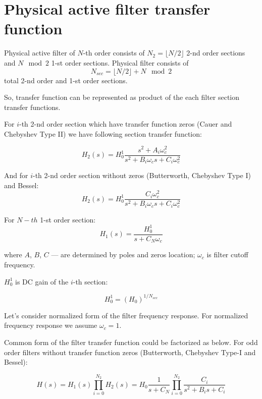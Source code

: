 \section{Physical active filter transfer function}

Physical active filter of $N$-th order consists of $N_{2} = \lfloor N/2\rfloor$
2-nd order sections and $N\mod 2$ 1-st order sections. Physical filter consists
of
\begin{equation}
 N_{sec}=\lfloor N/2\rfloor+N\mod 2 \label{order-sections}
\end{equation}
total 2-nd order and 1-st order sections.

So, transfer function can be represented as product of the each filter section
transfer functions.

For $i$-th 2-nd order section which have transfer function zeros (Cauer and
Chebyshev Type II) we have following section transfer function:

\begin{equation}
 H_2(s)=H_0^1\frac{s^2+A_i\omega_c^2}{s^2+B_i\omega_c s+C_i\omega_c^2}
\label{2ord1}
\end{equation}

And for $i$-th 2-nd order section without zeros (Butterworth, Chebyshev Type I)
and Bessel:
\begin{equation}
 H_2(s)=H_0^1\frac{C_i\omega_c^2}{s^2+B_i\omega_c s+C_i\omega_c^2} \label{2ord2}
\end{equation}

For $N-th$ 1-st order section:
\begin{equation}
 H_1(s)=\frac{H_0^1}{s+C_N\omega_c} \label{1ord}
\end{equation}


where $A$, $B$, $C$ --- are determined by poles and zeros location; $\omega_c$
is filter cutoff frequency.

$H_0^1$ is DC gain of the $i$-th section:

\begin{equation}
 H_0^1 = (H_0)^{1/N_{sec}} 
\end{equation}

Let's consider normalized form of the filter frequency response.
For normalized frequency response we assume $\omega_c=1$.

Common form of the filter transfer function could be factorized as below. For
odd order filters without transfer function zeros (Butterworth, Chebyshev Type-I
and Bessel):

\begin{equation}
 H(s)=H_1(s)\prod_{i=0}^{N_2}H_2(s) = 
 H_0\frac{1}{s+C_N}\prod_{i=0}^{N_2}\frac{C_i}{s^2+B_i s+C_i}
\end{equation}

